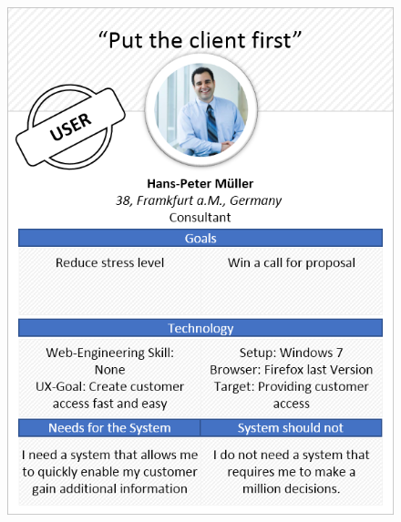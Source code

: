 \begin{figure}[H] 
        \centering\includegraphics[width=\textwidth]{img/diagrams/personas/owner1.png}
	\captionsetup{labelformat=empty}
        \caption[]{}
\end{figure}
